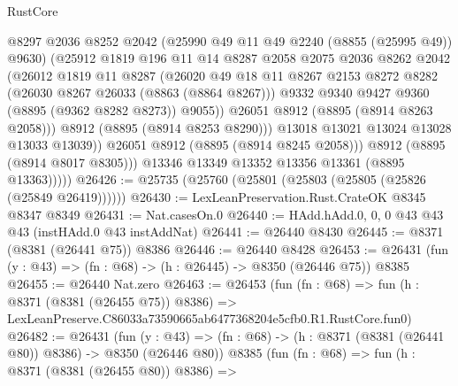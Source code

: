 \begin{lexlean}{RustCore}
\begin{coremodule}
                      @8297
                      @2036
                      @8252
                      @2042
                      (@25990 @49 @11 @49 @2240 (@8855 (@25995 @49)) @9630)
                      (@25912
                        @1819
                        @196
                        @11
                        @14
                        @8287
                        @2058
                        @2075
                        @2036
                        @8262
                        @2042
                        (@26012
                          @1819
                          @11
                          @8287
                          (@26020
                            @49
                            @18
                            @11
                            @8267
                            @2153
                            @8272
                            @8282
                            (@26030 @8267 @26033 (@8863 (@8864 @8267)))
                            @9332
                            @9340
                            @9427
                            @9360
                            (@8895 (@9362 @8282 @8273))
                            @9055))
                        @26051
                        @8912
                        (@8895 (@8914 @8263 @2058)))
                      @8912
                      (@8895 (@8914 @8253 @8290)))
                    @13018
                    @13021
                    @13024
                    @13028
                    @13033
                    @13039))
                @26051
                @8912
                (@8895 (@8914 @8245 @2058)))
              @8912
              (@8895 (@8914 @8017 @8305)))
            @13346
            @13349
            @13352
            @13356
            @13361
            (@8895 @13363)))))
@26426 := @25735 (@25760 (@25801 (@25803 (@25805 (@25826 (@25849 @26419))))))
@26430 := LexLeanPreservation.Rust.CrateOK @8345 @8347 @8349
@26431 := Nat.casesOn.{0}
@26440 := HAdd.hAdd.{0, 0, 0} @43 @43 @43 (instHAdd.{0} @43 instAddNat)
@26441 := @26440 @8430
@26445 := @8371 (@8381 (@26441 @75)) @8386
@26446 := @26440 @8428
@26453 := @26431 (fun (y : @43) => (fn : @68) -> (h : @26445) -> @8350 (@26446 @75)) @8385
@26455 := @26440 Nat.zero
@26463 := @26453
    (fun (fn : @68) =>
    fun (h : @8371 (@8381 (@26455 @75)) @8386) =>
    LexLeanPreserve.C86033a73590665ab6477368204e5cfb0.R1.RustCore.fun0)
@26482 := @26431
    (fun (y : @43) => (fn : @68) -> (h : @8371 (@8381 (@26441 @80)) @8386) -> @8350 (@26446 @80))
    @8385
    (fun (fn : @68) =>
    fun (h : @8371 (@8381 (@26455 @80)) @8386) =>

\end{coremodule}
\end{lexlean}
